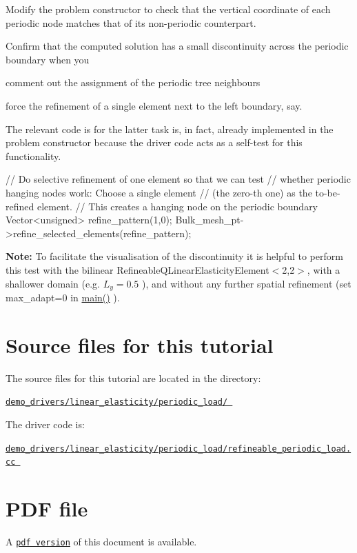 \begin{DoxyEnumerate}
\item Modify the problem constructor to check that the vertical coordinate of each periodic node matches that of its non-\/periodic counterpart.
\item Confirm that the computed solution has a small discontinuity across the periodic boundary when you
\begin{DoxyEnumerate}
\item comment out the assignment of the periodic tree neighbours
\item force the refinement of a single element next to the left boundary, say.
\end{DoxyEnumerate}The relevant code is for the latter task is, in fact, already implemented in the problem constructor because the driver code acts as a self-\/test for this functionality.  
\begin{DoxyCodeInclude}
 \textcolor{comment}{// Do selective refinement of one element so that we can test}
 \textcolor{comment}{// whether periodic hanging nodes work: Choose a single element }
 \textcolor{comment}{// (the zero-th one) as the to-be-refined element.}
 \textcolor{comment}{// This creates a hanging node on the periodic boundary}
 Vector<unsigned> refine\_pattern(1,0);
 Bulk\_mesh\_pt->refine\_selected\_elements(refine\_pattern);

\end{DoxyCodeInclude}
 {\bfseries Note\+:} To facilitate the visualisation of the discontinuity it is helpful to perform this test with the bilinear {\ttfamily Refineable\+Q\+Linear\+Elasticity\+Element$<$2,2$>$}, with a shallower domain (e.\+g. $ L_y = 0.5 $ ), and without any further spatial refinement (set {\ttfamily max\+\_\+adapt=0} in {\ttfamily \hyperlink{periodic__load_8cc_a0ddf1224851353fc92bfbff6f499fa97}{main()}} ).
\end{DoxyEnumerate}



 

\hypertarget{index_sources}{}\section{Source files for this tutorial}\label{index_sources}

\begin{DoxyItemize}
\item The source files for this tutorial are located in the directory\+: \begin{center} \href{../../../../demo_drivers/linear_elasticity/periodic_load/}{\tt demo\+\_\+drivers/linear\+\_\+elasticity/periodic\+\_\+load/ } \end{center} 
\item The driver code is\+: \begin{center} \href{../../../../demo_drivers/linear_elasticity/periodic_load/refineable_periodic_load.cc}{\tt demo\+\_\+drivers/linear\+\_\+elasticity/periodic\+\_\+load/refineable\+\_\+periodic\+\_\+load.\+cc } \end{center} 
\end{DoxyItemize}



 

 \hypertarget{index_pdf}{}\section{P\+D\+F file}\label{index_pdf}
A \href{../latex/refman.pdf}{\tt pdf version} of this document is available. 

